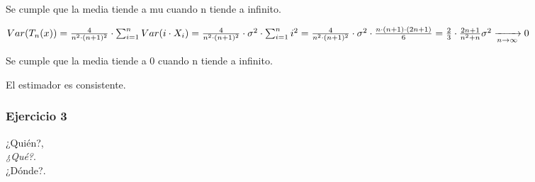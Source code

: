 \documentclass{article}
\begin{document}
Se cumple que la media tiende a mu cuando n tiende a infinito.

\(
Var(T_n(x))=\frac{4}{n^2 \cdot (n+1)^2} \cdot \sum_{i=1}^{n} Var(i\cdot X_i)
= \frac{4}{n^2 \cdot (n+1)^2} \cdot \sigma^2 \cdot \sum_{i=1}^{n} i^2 \\
= \frac{4}{n^2 \cdot (n+1)^2} \cdot \sigma^2 \cdot \frac{n \cdot (n+1) \cdot (2n+1)}{6}
=\frac{2}{3}\cdot \frac{2n+1}{n^2+n} \sigma^2 \xrightarrow[n \to \infty]{} 0
\)

Se cumple que la media tiende a 0 cuando n tiende a infinito.

El estimador es consistente.

\subsubsection*{Ejercicio 3}


\newpage
\begin{thebibliography}{9}
    ¿Quién?, \\ \textit{¿Qué?}. \\ ¿Dónde?.
\end{thebibliography}

\end{document}
